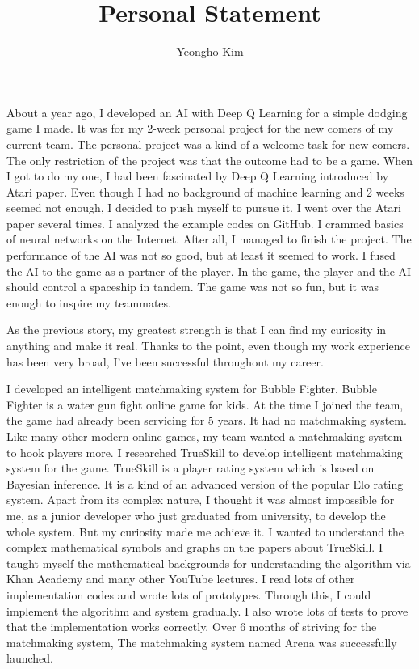 \documentclass[11pt]{article}
\author{Yeongho Kim}
\date{}
\title{Personal Statement}
\begin{document}
\maketitle
\vspace{-6ex}

About a year ago, I developed an AI with Deep Q Learning for a simple dodging game I made.
It was for my 2-week personal project for the new comers of my current team.
The personal project was a kind of a welcome task for new comers.
The only restriction of the project was that the outcome had to be a game.
When I got to do my one, I had been fascinated by Deep Q Learning introduced by Atari paper.
Even though I had no background of machine learning and 2 weeks seemed not enough, I decided to push myself to pursue it.
I went over the Atari paper several times. I analyzed the example codes on GitHub. I crammed basics of neural networks on the Internet.
After all, I managed to finish the project. The performance of the AI was not so good, but at least it seemed to work.
I fused the AI to the game as a partner of the player.
In the game, the player and the AI should control a spaceship in tandem.
The game was not so fun, but it was enough to inspire my teammates. 

As the previous story, my greatest strength is that I can find my curiosity in anything and make it real.
Thanks to the point, even though my work experience has been very broad, I've been successful throughout my career. 

I developed an intelligent matchmaking system for Bubble Fighter.
Bubble Fighter is a water gun fight online game for kids.
At the time I joined the team, the game had already been servicing for 5 years.
It had no matchmaking system.
Like many other modern online games, my team wanted a matchmaking system to hook players more.
I researched TrueSkill to develop intelligent matchmaking system for the game.
TrueSkill is a player rating system which is based on Bayesian inference.
It is a kind of an advanced version of the popular Elo rating system.
Apart from its complex nature, I thought it was almost impossible for me, as a junior developer who just graduated from university, to develop the whole system.
But my curiosity made me achieve it.
I wanted to understand the complex mathematical symbols and graphs on the papers about TrueSkill.
I taught myself the mathematical backgrounds for understanding the algorithm via Khan Academy and many other YouTube lectures.
I read lots of other implementation codes and wrote lots of prototypes.
Through this, I could implement the algorithm and system gradually.
I also wrote lots of tests to prove that the implementation works correctly.
Over 6 months of striving for the matchmaking system, The matchmaking system named Arena was successfully launched.
\end{document}
